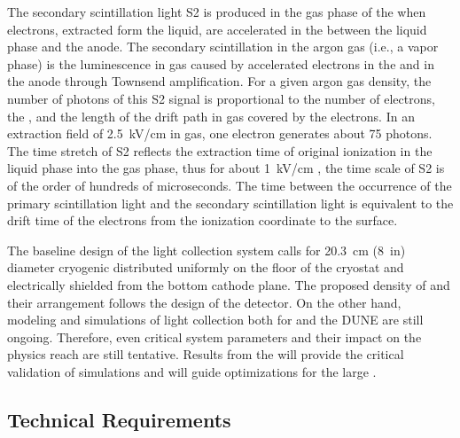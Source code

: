 The secondary scintillation light S2 is produced in the gas phase of the  when electrons, extracted form the liquid, are accelerated in the \efield between the liquid phase and the anode. The secondary scintillation in the argon gas (i.e., a vapor phase) is the luminescence in gas caused by accelerated electrons in the \efield and in the  anode through Townsend amplification. For a given argon gas density, the number of photons of this S2 signal is proportional to the number of electrons, the \efield, and the length of the drift path in gas covered by the electrons. In an extraction field of \SI{2.5}{kV/cm} in gas, one electron generates about \num{75} photons. The time stretch of S2 reflects the extraction time of original ionization in the liquid phase into the gas phase, thus for about \SI{1}{kV/cm} \efield, the time scale of S2 is of the order of hundreds of microseconds. The time between the occurrence of the primary scintillation light and the secondary scintillation light is equivalent to the drift time of the electrons from the ionization coordinate to the \lar surface.

The baseline design of the light collection system calls for \SI{20.3}{cm} (\SI{8}{in}) diameter cryogenic  distributed uniformly on the floor of the cryostat and electrically shielded from the bottom cathode plane. The proposed density of  and their arrangement follows the design of the  detector. On the other hand, modeling and simulations of light collection both for  and the DUNE  are still ongoing. Therefore, even critical system parameters and their impact on the physics reach are still tentative. Results from the  will provide the critical validation of simulations and will guide optimizations for the large .

\subsection{Technical Requirements}
\label{sec:fddp-pd-1.3}

